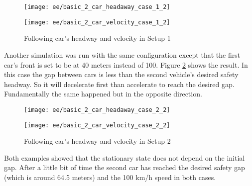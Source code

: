 		\begin{figure}
			\centering
			\begin{minipage}{.5\textwidth}
				\centering
				\texttt{[image: ee/basic\_2\_car\_headaway\_case\_1\_2]}
			\end{minipage}\hfill
			\begin{minipage}{.5\textwidth}
				\centering
				\texttt{[image: ee/basic\_2\_car\_velocity\_case\_1\_2]}
			\end{minipage}
			\caption{Following car's headway and velocity in Setup 1}
			\label{fig:basic2car_case_1}
		\end{figure}

		Another simulation was run with the same configuration except that the first car's front is set to be at 40 meters instead of 100. Figure \ref{fig:basic2car_case_2} shows the result. In this case the gap between cars is less than the second vehicle's desired safety headway. So it will decelerate first than accelerate to reach the desired gap. Fundamentally the same happened but in the opposite direction.
		\begin{figure}
			\centering
			\begin{minipage}{.5\textwidth}
				\centering
				\texttt{[image: ee/basic\_2\_car\_headaway\_case\_2\_2]}
			\end{minipage}\hfill
			\begin{minipage}{.5\textwidth}
				\centering
				\texttt{[image: ee/basic\_2\_car\_velocity\_case\_2\_2]}
			\end{minipage}
			\caption{Following car's headway and velocity in Setup 2}
			\label{fig:basic2car_case_2}
		\end{figure}
		Both examples showed that the stationary state does not depend on the initial gap. After a little bit of time the second car has reached the desired safety gap (which is around 64.5 meters) and the 100 km/h speed in both cases.
